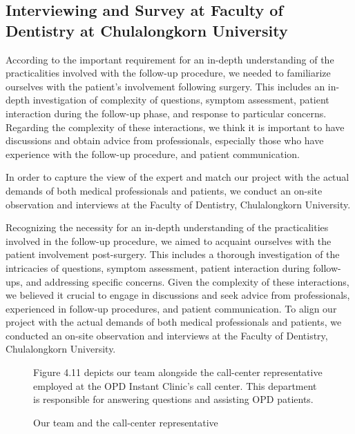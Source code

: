 \documentclass[12pt,oneside,openright,a4paper]{cpe-english-project}
\begin{document}
    \subsection{Interviewing and Survey at Faculty of Dentistry at Chulalongkorn University}
      \qquad According to the important requirement for an in-depth understanding of the practicalities involved with the follow-up procedure, we needed to familiarize ourselves with the patient's involvement following surgery. This includes an in-depth investigation of  complexity of questions, symptom assessment, patient interaction during the follow-up phase, and response to particular concerns. Regarding the complexity of these interactions, we think it is important to have discussions and obtain advice from professionals, especially those who have experience with the follow-up procedure, and patient communication. \par
      \qquad In order to capture the view of the expert and  match our project with the actual demands of both medical professionals and patients, we conduct an on-site observation and interviews at the Faculty of Dentistry, Chulalongkorn University. \par
      \qquad Recognizing the necessity for an in-depth understanding of the practicalities involved in the follow-up procedure, we aimed to acquaint ourselves with the patient involvement post-surgery. This includes a thorough investigation of the intricacies of questions, symptom assessment, patient interaction during follow-ups, and addressing specific concerns. Given the complexity of these interactions, we believed it crucial to engage in discussions and seek advice from professionals, experienced in follow-up procedures, and patient communication. To align our project with the actual demands of both medical professionals and patients, we conducted an on-site observation and interviews at the Faculty of Dentistry, Chulalongkorn University. \par
      \begin{figure}[!h]
        \centering
        \caption{Our team and the call-center representative}\label{fig:Interview_1}
        \begin{flushleft}
          \qquad Figure 4.11 depicts our team alongside the call-center representative employed at the OPD Instant Clinic's call center. This department is responsible for answering questions and assisting OPD patients. \par
        \end{flushleft}        
      \end{figure}
\end{document}
